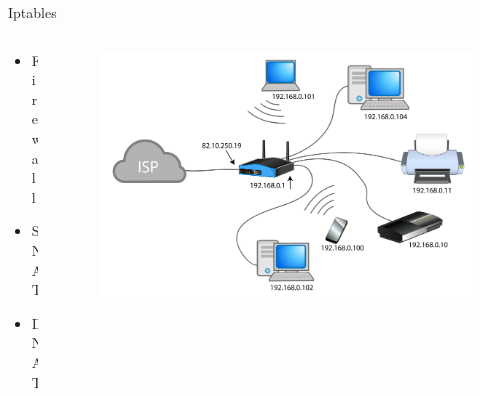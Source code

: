 \documentclass[aspectratio=169,10pt,t]{beamer}
\begin{document}
\begin{frame}[t]{Iptables}{\phantom{(y)}}
\begin{columns}
	\begin{column}{0.2\textwidth}
	\begin{itemize}
		\item Firewall
		\item SNAT
		\item DNAT
	\end{itemize}
		
	\end{column}
	\begin{column}{0.8\textwidth}
	\vspace{-1.1cm}
	\begin{figure}[h]
		\centering
		\includegraphics[width=1\linewidth]{Img/NAT.png}
	\end{figure}
		
	\end{column}
	
\end{columns}



\end{frame}
\end{document}
